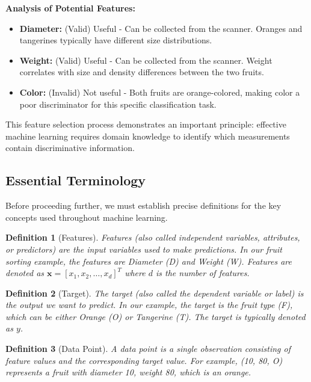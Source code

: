 \documentclass[12pt,a4paper]{article}
\theoremstyle{directpoint}
\newtheorem*{definition}{Definition}
\theoremstyle{definition}
\begin{document}
\textbf{Analysis of Potential Features:}
\begin{itemize}
    \item \textbf{Diameter:} (Valid) Useful - Can be collected from the scanner. Oranges and tangerines typically have different size distributions.
    \item \textbf{Weight:} (Valid) Useful - Can be collected from the scanner. Weight correlates with size and density differences between the two fruits.
    \item \textbf{Color:} (Invalid) Not useful - Both fruits are orange-colored, making color a poor discriminator for this specific classification task.
\end{itemize}

This feature selection process demonstrates an important principle: effective machine learning requires domain knowledge to identify which measurements contain discriminative information.

\subsection{Essential Terminology}

Before proceeding further, we must establish precise definitions for the key concepts used throughout machine learning.

\begin{definition}[Features]
Features (also called independent variables, attributes, or predictors) are the input variables used to make predictions. In our fruit sorting example, the features are Diameter (D) and Weight (W). Features are denoted as $\mathbf{x} = [x_1, x_2, \ldots, x_d]^T$ where $d$ is the number of features.
\end{definition}

\begin{definition}[Target]
The target (also called the dependent variable or label) is the output we want to predict. In our example, the target is the fruit type (F), which can be either Orange (O) or Tangerine (T). The target is typically denoted as $y$.
\end{definition}

\begin{definition}[Data Point]
A data point is a single observation consisting of feature values and the corresponding target value. For example, (10, 80, O) represents a fruit with diameter 10, weight 80, which is an orange.
\end{definition}
\end{document}

